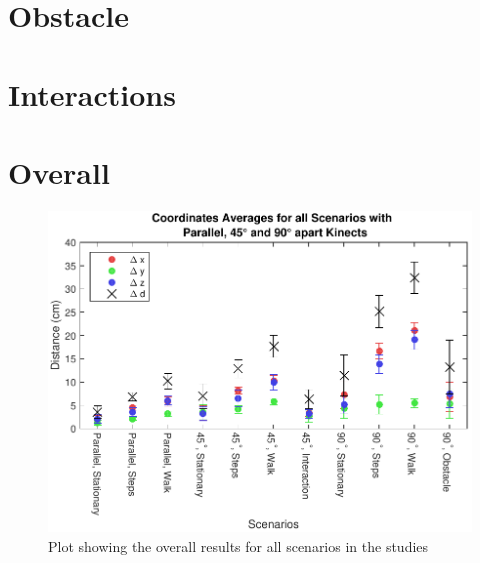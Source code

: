 \section{Obstacle}
\label{sec:results_obstacle}

\section{Interactions}
\label{sec:results_interactions}

\section{Overall}
\label{sec:results_overall}

\begin{figure}[!h]
  \centering

  \includegraphics[width=1.0\linewidth]{figs/Coordinates_All}

  \caption{Plot showing the overall results for all scenarios in the studies}

  \label{fig:results_overall}
\end{figure}

